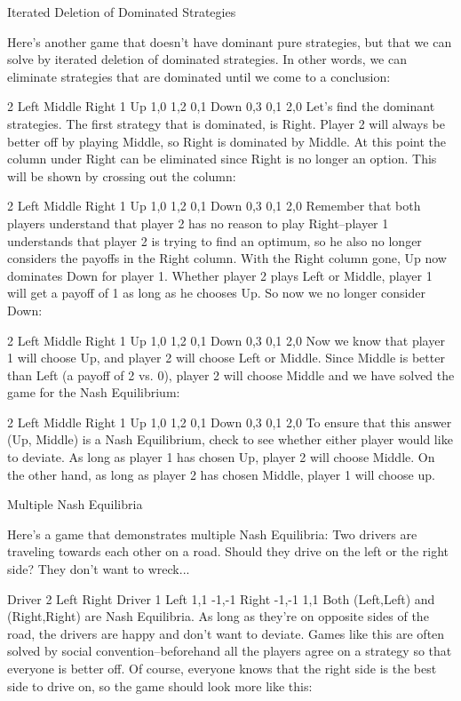 Iterated Deletion of Dominated Strategies

Here's another game that doesn't have dominant pure strategies, but that we can solve by iterated deletion of dominated strategies. In other words, we can eliminate strategies that are dominated until we come to a conclusion:

2
Left	Middle	Right
1	Up	1,0	1,2	0,1
Down	0,3	0,1	2,0
Let's find the dominant strategies. The first strategy that is dominated, is Right. Player 2 will always be better off by playing Middle, so Right is dominated by Middle. At this point the column under Right can be eliminated since Right is no longer an option. This will be shown by crossing out the column:

2
Left	Middle	Right
1	Up	1,0	1,2	0,1
Down	0,3	0,1	2,0
Remember that both players understand that player 2 has no reason to play Right--player 1 understands that player 2 is trying to find an optimum, so he also no longer considers the payoffs in the Right column. With the Right column gone, Up now dominates Down for player 1. Whether player 2 plays Left or Middle, player 1 will get a payoff of 1 as long as he chooses Up. So now we no longer consider Down:

2
Left	Middle	Right
1	Up	1,0	1,2	0,1
Down	0,3	0,1	2,0
Now we know that player 1 will choose Up, and player 2 will choose Left or Middle. Since Middle is better than Left (a payoff of 2 vs. 0), player 2 will choose Middle and we have solved the game for the Nash Equilibrium:

2
Left	Middle	Right
1	Up	1,0	1,2	0,1
Down	0,3	0,1	2,0
To ensure that this answer (Up, Middle) is a Nash Equilibrium, check to see whether either player would like to deviate. As long as player 1 has chosen Up, player 2 will choose Middle. On the other hand, as long as player 2 has chosen Middle, player 1 will choose up.

Multiple Nash Equilibria

Here's a game that demonstrates multiple Nash Equilibria: Two drivers are traveling towards each other on a road. Should they drive on the left or the right side? They don't want to wreck...

Driver 2
Left	Right
Driver 1	Left	1,1	-1,-1
Right	-1,-1	1,1
Both (Left,Left) and (Right,Right) are Nash Equilibria. As long as they're on opposite sides of the road, the drivers are happy and don't want to deviate. Games like this are often solved by social convention--beforehand all the players agree on a strategy so that everyone is better off. Of course, everyone knows that the right side is the best side to drive on, so the game should look more like this:

